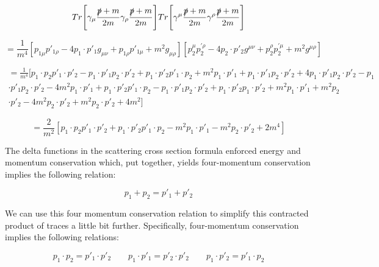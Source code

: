 \documentclass[a4]{article}
\begin{document}
    \begin{equation}
        Tr \Bigg[ \gamma_{\mu} \frac{\slashed{p} + m}{2m} \gamma_{\rho} \frac{\slashed{p} + m}{2m} \Bigg] Tr \Bigg[ \gamma^{\mu} \frac{\slashed{p} + m}{2m} \gamma^{\rho} \frac{\slashed{p} + m}{2m} \Bigg]
    \end{equation}

    \begin{equation}
        = \frac{1}{m^4} [p_{1 \mu} p'_{1 \rho} - 4 p_1 \cdot p'_1 g_{\mu \nu} + p_{1 \rho} p'_{1 \mu} + m^2 g_{\mu \rho}] [p_{2}^{\mu} p_{2}^{' \rho} - 4 p_2 \cdot p'_2 g^{\mu \nu} + p_{2}^{\rho} p_{2}^{' \mu} + m^2 g^{\mu \rho}]
    \end{equation}

    \begin{eqnarray}
        = \frac{1}{m^4} [p_1 \cdot p_2 p'_1 \cdot p'_2 - p_1 \cdot p'_1 p_2 \cdot p'_2 + p_1 \cdot p'_2 p'_1 \cdot p_2 + m^2 p_1 \cdot p'_1 + p_1 \cdot p'_1 p_2 \cdot p'_2 + 4 p_1 \cdot p'_1 p_2 \cdot p'_2 - p_1 \\
        \cdot p'_1 p_2 \cdot p'_2 - 4 m^2 p_1 \cdot p'_1 + p_1 \cdot p'_2 p'_1 \cdot p_2 - p_1 \cdot p'_1 p_2 \cdot p'_2 + p_1 \cdot p'_2 p_1 \cdot p'_2 + m^2 p_1 \cdot p'_1 + m^2 p_2 \\
        \cdot p'_2 - 4 m^2 p_2 \cdot p'_2 + m^2 p_2 \cdot p'_2 + 4 m^2]
    \end{eqnarray}

    \begin{equation}
        = \frac{2}{m^2} [p_1 \cdot p_2 p'_1 \cdot p'_2 + p_1 \cdot p'_2 p'_1 \cdot p_2 - m^2 p_1 \cdot p'_1 - m^2 p_2 \cdot p'_2 + 2 m^4]
    \end{equation}

    The delta functions in the scattering cross section formula enforced energy and momentum conservation which, put together, yields four-momentum conservation implies the following relation:

    \begin{equation}
        p_1 + p_2 = p'_1 + p'_2
    \end{equation}

    We can use this four momentum conservation relation to simplify this contracted product of traces a little bit further. Specifically, four-momentum conservation implies the following relations:

    \begin{equation}
        p_1 \cdot p_2 = p'_1 \cdot p'_2 \qquad p_1 \cdot p'_1 = p'_2 \cdot p'_2 \qquad p_1 \cdot p'_2 = p'_1 \cdot p_2
    \end{equation}
\end{document}
